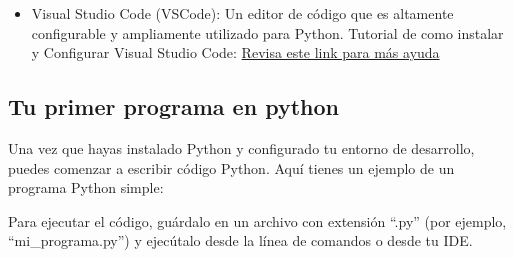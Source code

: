 \begin{itemize}
    \item Visual Studio Code (VSCode): Un editor de código que es altamente configurable y ampliamente utilizado para Python. Tutorial de como instalar y Configurar Visual Studio Code:
    \href{https://www.youtube.com/watch?v=X_Z7d04x9-E}{Revisa este link para más ayuda}
    \begin{figure}[h]
        \centering
      \end{figure}
\end{itemize}
\newpage

\subsection{Tu primer programa en python}

Una vez que hayas instalado Python y configurado tu entorno de desarrollo, puedes comenzar a escribir código Python. Aquí tienes un ejemplo de un programa Python simple:
\begin{figure}[h]
    \centering
  \end{figure}
Para ejecutar el código, guárdalo en un archivo con extensión ``.py'' (por ejemplo, ``mi\_programa.py'') y ejecútalo desde la línea de comandos o desde tu IDE.


